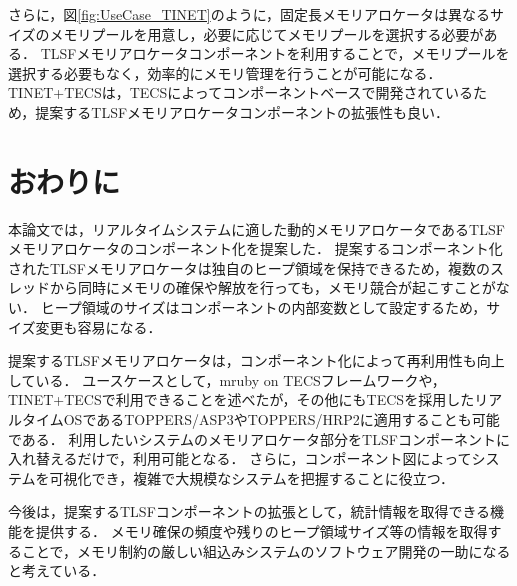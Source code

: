 \documentclass[submit,techrep]{ipsj_v2/UTF8/ipsj}
\begin{document}
さらに，図\ref{fig:UseCase_TINET}のように，固定長メモリアロケータは異なるサイズのメモリプールを用意し，必要に応じてメモリプールを選択する必要がある．
TLSFメモリアロケータコンポーネントを利用することで，メモリプールを選択する必要もなく，効率的にメモリ管理を行うことが可能になる．
TINET+TECSは，TECSによってコンポーネントベースで開発されているため，提案するTLSFメモリアロケータコンポーネントの拡張性も良い．


\section{おわりに}
\label{sec:Conclusion}

本論文では，リアルタイムシステムに適した動的メモリアロケータであるTLSFメモリアロケータのコンポーネント化を提案した．
提案するコンポーネント化されたTLSFメモリアロケータは独自のヒープ領域を保持できるため，複数のスレッドから同時にメモリの確保や解放を行っても，メモリ競合が起こすことがない．
ヒープ領域のサイズはコンポーネントの内部変数として設定するため，サイズ変更も容易になる．

提案するTLSFメモリアロケータは，コンポーネント化によって再利用性も向上している．
ユースケースとして，mruby on TECSフレームワークや，TINET+TECSで利用できることを述べたが，その他にもTECSを採用したリアルタイムOSであるTOPPERS/ASP3\cite{par:ASP3}やTOPPERS/HRP2\cite{par:hr-tecs}に適用することも可能である．
利用したいシステムのメモリアロケータ部分をTLSFコンポーネントに入れ替えるだけで，利用可能となる．
さらに，コンポーネント図によってシステムを可視化でき，複雑で大規模なシステムを把握することに役立つ．

今後は，提案するTLSFコンポーネントの拡張として，統計情報を取得できる機能を提供する．
メモリ確保の頻度や残りのヒープ領域サイズ等の情報を取得することで，メモリ制約の厳しい組込みシステムのソフトウェア開発の一助になると考えている．




\end{document}
